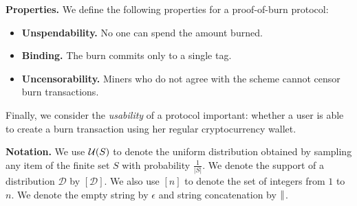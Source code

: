 \noindent
\textbf{Properties.}
We define the following properties for a proof-of-burn protocol:
\begin{itemize}
    \item \textbf{Unspendability.} No one can spend the amount burned.
    \item \textbf{Binding.} The burn commits only to a single tag.
    \item \textbf{Uncensorability.} Miners who do not agree with the scheme cannot censor burn transactions.
\end{itemize}

Finally, we consider the \emph{usability} of a protocol important: whether a user is able to create a burn transaction using her regular cryptocurrency wallet.

\noindent
\textbf{Notation.} We use $\mathcal{U}(S)$ to denote the uniform distribution
obtained by sampling any item of the finite set $S$ with probability $\frac{1}{|S|}$.
We denote the support of a distribution $\mathcal{D}$ by $[\mathcal{D}]$. We also use $[n]$ to denote the set of integers from $1$ to $n$.
We denote the empty string by $\epsilon$ and string concatenation by $\mathbin{\|}$.
